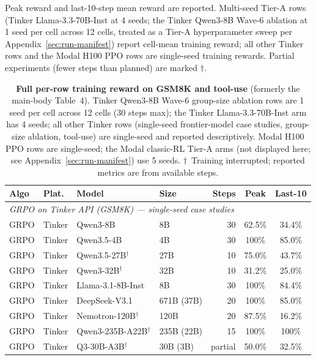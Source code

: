 Peak reward and last-10-step mean reward are reported. Multi-seed Tier-A
rows (Tinker Llama-3.3-70B-Inst at 4 seeds; the Tinker Qwen3-8B Wave-6
ablation at 1 seed per cell across 12 cells, treated as a Tier-A
hyperparameter sweep per Appendix~\ref{sec:run-manifest}) report cell-mean
training reward; all other Tinker rows and the Modal H100 PPO rows are
single-seed training rewards. Partial experiments (fewer steps than
planned) are marked $\dagger$.

\begin{table}[h]
\centering
\caption{\textbf{Full per-row training reward on GSM8K and tool-use} (formerly
the main-body Table~4). Tinker Qwen3-8B Wave-6 group-size ablation rows are
1 seed per cell across 12 cells (30 steps max); the Tinker Llama-3.3-70B-Inst
arm has 4 seeds; all other Tinker rows
(single-seed frontier-model case studies, group-size ablation, tool-use)
are single-seed and reported descriptively. Modal H100 PPO rows are
single-seed; the Modal classic-RL Tier-A arms (not displayed here; see
Appendix~\ref{sec:run-manifest}) use 5 seeds.
$\dagger$~Training interrupted; reported metrics are from available steps.}
\label{tab:main_results}
\scriptsize
\setlength{\tabcolsep}{3pt}
\begin{tabular}{@{}l l l l r c c@{}}
\toprule
\textbf{Algo} & \textbf{Plat.} & \textbf{Model} & \textbf{Size} & \textbf{Steps} & \textbf{Peak} & \textbf{Last-10} \\
\midrule
\multicolumn{7}{l}{\textit{GRPO on Tinker API (GSM8K) --- single-seed case studies}} \\
\midrule
GRPO & Tinker & Qwen3-8B & 8B & 30 & 62.5\% & 34.4\% \\
GRPO & Tinker & Qwen3.5-4B & 4B & 30 & 100\% & 85.0\% \\
GRPO & Tinker & Qwen3.5-27B$^\dagger$ & 27B & 10 & 75.0\% & 43.7\% \\
GRPO & Tinker & Qwen3-32B$^\dagger$ & 32B & 10 & 31.2\% & 25.0\% \\
GRPO & Tinker & Llama-3.1-8B-Inst & 8B & 30 & 100\% & 84.4\% \\
GRPO & Tinker & DeepSeek-V3.1 & 671B (37B) & 20 & 100\% & 85.0\% \\
GRPO & Tinker & Nemotron-120B$^\dagger$ & 120B & 20 & 87.5\% & 16.2\% \\
GRPO & Tinker & Qwen3-235B-A22B$^\dagger$ & 235B (22B) & 15 & 100\% & 100\% \\
GRPO & Tinker & Q3-30B-A3B$^\dagger$ & 30B (3B) & partial & 50.0\% & 32.5\% \\

\end{tabular}
\end{table}
